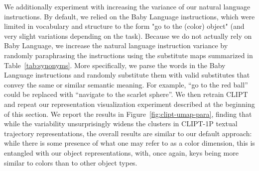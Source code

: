 \documentclass[../main.tex]{subfiles}
\begin{document}
We additionally experiment with increasing the variance of our natural language instructions. By
default, we relied on the Baby Language instructions, which were limited in vocabulary and structure
to the form "go to the ({color}) {object}" (and very slight variations depending on the task).
Because we do not actually rely on Baby Language, we increase the natural language instruction
variance by randomly paraphrasing the instructions using the substitute maps summarized in
Table~\ref{tab:synonyms}. More specifically, we parse the words in the Baby Language instructions
and randomly substitute them with valid substitutes that convey the same or similar semantic
meaning. For example, ``go to the red ball'' could be replaced with ``navigate to the scarlet sphere''. We then retrain CLIPT and repeat our representation visualization experiment described at
the beginning of this section. We report the results in Figure~\ref{fig:clipt-umap-para}, finding
that while the variability unsurprisingly widens the clusters in CLIPT-1P textual trajectory
representations, the overall results are similar to our default approach: while there is some
presence of what one may refer to as a color dimension, this is entangled with our object
representations, with, once again, keys being more similar to colors than to other object types.
\end{document}
